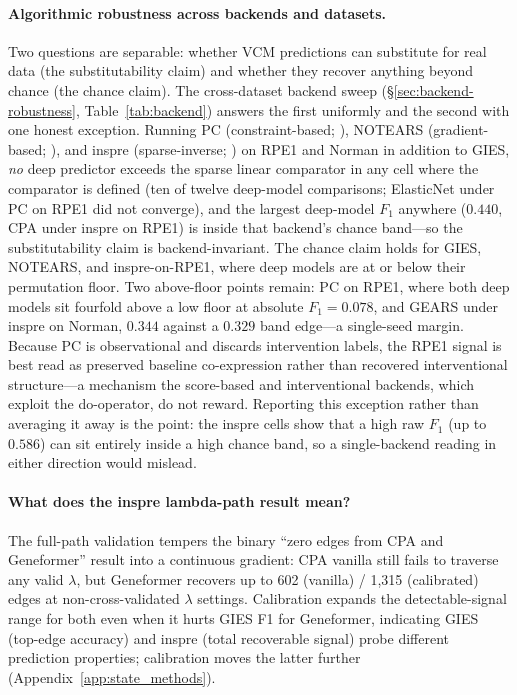 \documentclass{article}
\theoremstyle{plain}
\theoremstyle{definition}
\theoremstyle{remark}
\begin{document}
\paragraph{Algorithmic robustness across backends and datasets.}
Two questions are separable: whether VCM predictions can substitute for real data (the substitutability claim) and whether they recover anything beyond chance (the chance claim). The cross-dataset backend sweep (\S\ref{sec:backend-robustness}, Table~\ref{tab:backend}) answers the first uniformly and the second with one honest exception. Running PC (constraint-based; \citealt{spirtes2000}), NOTEARS (gradient-based; \citealt{zheng2018notears}), and inspre (sparse-inverse; \citealt{brown2025inspre}) on RPE1 and Norman in addition to GIES, \emph{no} deep predictor exceeds the sparse linear comparator in any cell where the comparator is defined (ten of twelve deep-model comparisons; ElasticNet under PC on RPE1 did not converge), and the largest deep-model $F_1$ anywhere ($0.440$, CPA under inspre on RPE1) is inside that backend's chance band---so the substitutability claim is backend-invariant. The chance claim holds for GIES, NOTEARS, and inspre-on-RPE1, where deep models are at or below their permutation floor. Two above-floor points remain: PC on RPE1, where both deep models sit fourfold above a low floor at absolute $F_1 = 0.078$, and GEARS under inspre on Norman, $0.344$ against a $0.329$ band edge---a single-seed margin. Because PC is observational and discards intervention labels, the RPE1 signal is best read as preserved baseline co-expression rather than recovered interventional structure---a mechanism the score-based and interventional backends, which exploit the do-operator, do not reward. Reporting this exception rather than averaging it away is the point: the inspre cells show that a high raw $F_1$ (up to $0.586$) can sit entirely inside a high chance band, so a single-backend reading in either direction would mislead.

\paragraph{What does the inspre lambda-path result mean?}
The full-path validation tempers the binary ``zero edges from CPA and Geneformer'' result into a continuous gradient: CPA vanilla still fails to traverse any valid $\lambda$, but Geneformer recovers up to 602 (vanilla) / 1{,}315 (calibrated) edges at non-cross-validated $\lambda$ settings. Calibration expands the detectable-signal range for both even when it hurts GIES F1 for Geneformer, indicating GIES (top-edge accuracy) and inspre (total recoverable signal) probe different prediction properties; calibration moves the latter further (Appendix~\ref{app:state_methods}).
\end{document}
